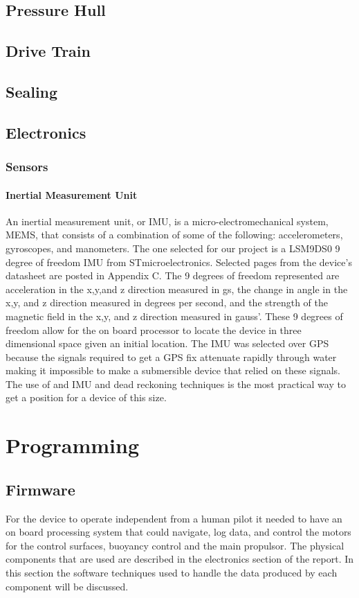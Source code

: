 \documentclass{report}
\begin{document}
\subsection{Pressure Hull}
\subsection{Drive Train}
\subsection{Sealing}
\subsection{Electronics}

\subsubsection{Sensors}
\paragraph{Inertial Measurement Unit}
An inertial measurement unit, or IMU, is a micro-electromechanical system, MEMS, that consists of a combination of some of the following: accelerometers, gyroscopes, and manometers. The one selected for our project is a LSM9DS0 9 degree of freedom IMU from STmicroelectronics. Selected pages from the device's datasheet are posted in Appendix C. The 9 degrees of freedom represented are acceleration in the x,y,and z direction measured in gs, the change in angle in the x,y, and z direction measured in degrees per second, and the strength of the magnetic field in the x,y, and z direction measured in gauss'. These 9 degrees of freedom allow for the on board processor to locate the device in three dimensional space given an initial location. The IMU was selected over GPS because the signals required to get a GPS fix attenuate rapidly through water making it impossible to make a submersible device that relied on these signals. The use of and IMU and dead reckoning techniques is the most practical way to get a position for a device of this size. 
\section{Programming}
\subsection{Firmware}
For the device to operate independent from a human pilot it needed to have an on board processing system that could navigate, log data, and control the motors for the control surfaces, buoyancy control and the main propulsor. The physical components that are used are described in the electronics section of the report. In this section the software techniques used to handle the data produced by each component will be discussed.
\end{document}
